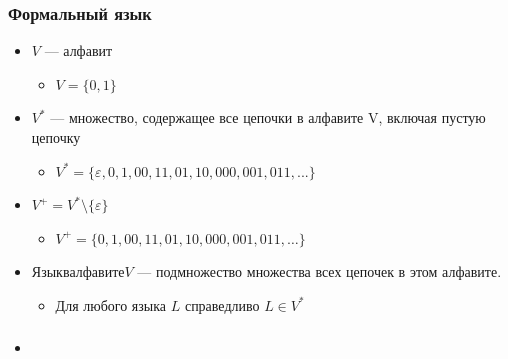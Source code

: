 \documentclass{beamer}
\begin{document}
\begin{frame}[fragile]
  \transwipe[direction=90]
  \frametitle{Формальный язык}
  \begin{itemize}
    \item $V$ --- алфавит
    \begin{itemize}
      \item $V = \{ 0, 1 \}$
    \end{itemize}
    \item $V^*$ --- множество, содержащее все цепочки в алфавите V, включая пустую цепочку
    \begin{itemize}
      \item $V^*=  \{ \varepsilon, 0, 1, 00, 11, 01, 10, 000, 001, 011, ... \}$
    \end{itemize}
    \item $V^+ = V^* \setminus \{ \varepsilon \} $ 
    \begin{itemize}
      \item $V^+ = \{0, 1, 00, 11, 01, 10, 000, 001, 011, \dots \}$
    \end{itemize}
    \item $Язык в алфавите V$ --- подмножество множества всех цепочек в этом алфавите. 
    \begin{itemize} 
      \item Для любого языка $L$ справедливо $L \in V^*$
    \end{itemize}
  \end{itemize}
\end{frame}


\begin{frame}[fragile]
  \transwipe[direction=90]
  \frametitle{}
  \begin{itemize}
    \item 
  \end{itemize}
\end{frame}
\end{document}
